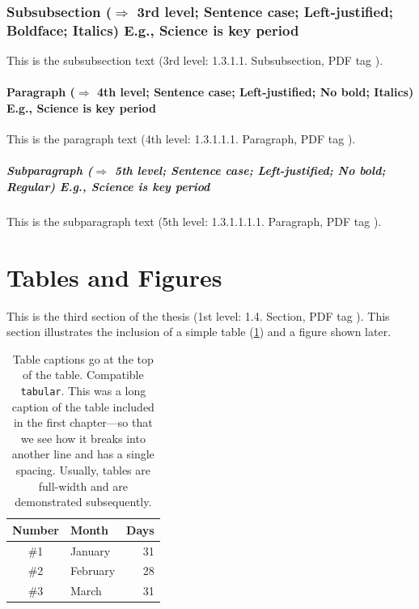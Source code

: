 \documentclass[ms-thesis,mathdesign,chpterrefs,showgrid]{ndsu-thesis-tagged}%
\begin{document}
\mysectop
\subsubsection{Subsubsection ($\Rightarrow$ 3rd level; Sentence case; Left-justified; Boldface; Italics) E.g., Science is key period}
This is the subsubsection text (3rd level: 1.3.1.1. Subsubsection, PDF tag ). \repText

\paragraph{Paragraph ($\Rightarrow$ 4th level; Sentence case; Left-justified; No bold; Italics)  E.g., Science is key period}
This is the paragraph text (4th level: 1.3.1.1.1. Paragraph, PDF tag ). \repText[18]

\subparagraph{Subparagraph ($\Rightarrow$ 5th level; Sentence case; Left-justified; No bold; Regular) E.g., Science is key period}
This is the subparagraph text (5th level: 1.3.1.1.1.1. Paragraph, PDF tag ). \repText[20]

\section{Tables and Figures}
This is the third section of the thesis (1st level: 1.4. Section, PDF tag ). This section illustrates the inclusion of a simple table (\cref{tab:1}) and a figure shown later.

\voh%
\begin{table}[ht!]
\centering
\caption{Table captions go at the top of the table. Compatible \texttt{tabular}. This was a long caption of the table included in the first chapter---so that we see how it breaks into another line and has a single spacing. Usually, tables are full-width and are demonstrated subsequently.}
\label{tab:1}
\pvo
{}%
\begin{tabular}{clr}
\toprule
Number & Month & Days\\
\midrule
\#1 & January    & 31\\
\#2 & February   & 28\\
\#3 & March      & 31\\
\bottomrule
\end{tabular}
\end{table}	
\end{document}
